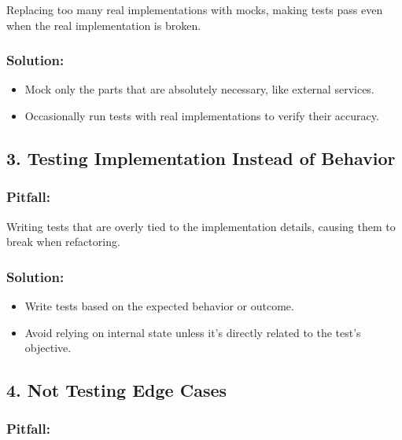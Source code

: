 \documentclass[
]{article}
\providecommand{\tightlist}{%
  \setlength{\itemsep}{0pt}\setlength{\parskip}{0pt}}
\begin{document}
Replacing too many real implementations with mocks, making tests pass
even when the real implementation is broken.

\subsubsection{Solution:}\label{solution-1}

\begin{itemize}
\tightlist
\item
  Mock only the parts that are absolutely necessary, like external
  services.
\item
  Occasionally run tests with real implementations to verify their
  accuracy.
\end{itemize}

\subsection{3. Testing Implementation Instead of
Behavior}\label{testing-implementation-instead-of-behavior}

\subsubsection{Pitfall:}\label{pitfall-2}

Writing tests that are overly tied to the implementation details,
causing them to break when refactoring.

\subsubsection{Solution:}\label{solution-2}

\begin{itemize}
\tightlist
\item
  Write tests based on the expected behavior or outcome.
\item
  Avoid relying on internal state unless it's directly related to the
  test's objective.
\end{itemize}

\subsection{4. Not Testing Edge Cases}\label{not-testing-edge-cases}

\subsubsection{Pitfall:}\label{pitfall-3}
\end{document}
